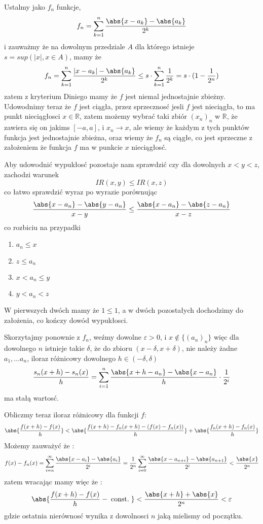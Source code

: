 \documentclass[11pt]{scrartcl}
\begin{document}
        \begin{walk}
          \item Ustalmy jako $f_n$ funkcje,
        \[
            f_n = \sum_{k = 1}^{n} \frac{\abs{x - a_k} - \abs{a_k} }{2^k} 
        \]
        i zauważmy że na dowolnym przedziale $A$ dla którego istnieje $s = sup(|x|, x \in A)$, mamy że
        \[
          f_n = \sum_{k = 1}^{n} \frac{|x-a_k| - \abs{a_k} }{2^k} \leq s \cdot \sum_{k = 1}^{n} \frac{1}{2^k} = s \cdot (1 - \frac{1}{2^n})  
        \]
        zatem z kryterium Diniego mamy że $f$ jest niemal jednostajnie zbieżny.
        Udowodnimy teraz że $f$ jest ciągła, przez sprzecznosć jesli $f$ jest nieciągła, to ma punkt nieciągłosci $x \in \mathbb{R} $, zatem możemy wybrać taki zbiór $(x_n)_n$ w $\mathbb{R} $, że zawiera się on jakims $[-a,a]$, i $x_n \to x$, ale wiemy że każdym z tych punktów funkcja jest jednostajnie zbieżna, oraz wiemy że $f_n$ są ciągłe, co jest sprzeczne z założeniem że funkcja $f$ ma w punkcie $x$ nieciągłosć.
        
        Aby udowodnić wypukłosć pozostaje nam sprawdzić czy dla dowolnych $x <  y  <  z$, zachodzi warunek
        \[
            IR(x, y) \leq IR(x,z)
        \]
        co łatwo sprawdzić wyraz po wyrazie porównując 
        \[
            \frac{\abs{x - a_n} - \abs{y - a_n}  }{x - y} \leq \frac{\abs{x-a_n} - \abs{z - a_n}  }{x - z}
        \]
        co rozbiciu na przypadki 
        \begin{enumerate}
            \item $a_n \leq x$
            \item $z \leq a_n$
            \item $x < a_n \leq y$
            \item $y < a_n < z$
        \end{enumerate}
        W pierwszych dwóch mamy że $1 \leq 1$, a w dwóch pozostałych dochodzimy do założenia, co kończy dowód wypukłosci.
      \item Skorzytajmy ponownie z $f_n$, weźmy dowolne $\varepsilon > 0$, i $x \not \in \{ (a_n)_n \}$ więc dla dowolnego $n$ istnieje takie $\delta$, że do zbioru $ \left ( x - \delta , x + \delta \right )$, nie należy żadne $a_1 , \dots a_n$, iloraz różnicowy dowolnego $h \in ( - \delta, \delta )$
        \[
            \frac{s_n (x + h) - s_n (x)}{h} = \sum_{i = 1}^{n} \frac{\abs{x + h - a_n} - \abs{x - a_n}  }{h} \cdot  \frac{1}{2^i} 
        \]
        ma stałą wartosć.

        Obliczmy teraz iloraz różnicowy dla funkcji $f$:
        \[
        \abs{ \frac{f(x + h) - f(x)}{h}} < \abs{\frac{f(x+h) - f_n(x+h) - (f(x) - f_n (x))}{h}} + \abs{\frac{f_n(x+h) - f_n (x)}{h}}
      \]
        Możemy zauważyć że :
        \[
          f(x) - f_n (x) = \sum_{i = n}^{\infty } \frac{\abs{x - a_i}  - \abs{a_i} }{2^i} = \frac{1}{2^n} \sum_{i = 0}^{\infty } \frac{\abs{x - a_{n+i}} - \abs{a_{n+1}}  }{2^i} < \frac{\abs{x} }{2^n}    
        \]
        zatem wracając mamy więc że :
        \[
            \abs{ \frac{f(x + h) - f(x)}{h} - \; \text{const.} \; } < \frac{\abs{x + h} + \abs{x}  }{2^n} < \varepsilon
        \]
        gdzie ostatnia nierównosć wynika z dowolnosci $n$ jaką mielismy od początku.
        
      \end{walk}
        
\end{document}
